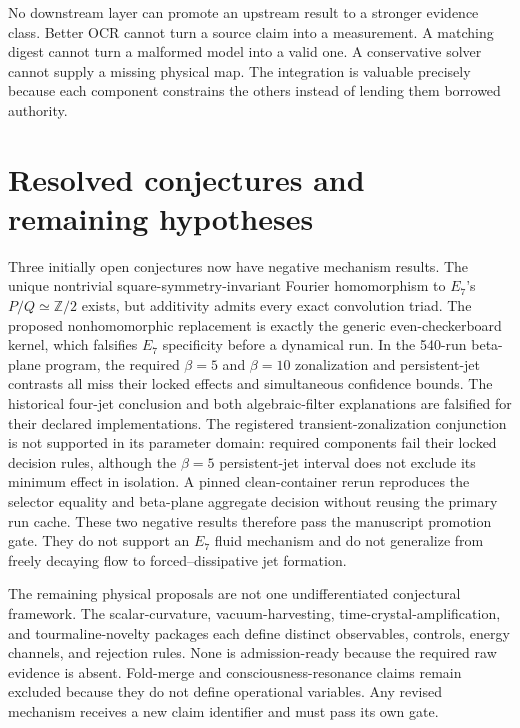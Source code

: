 No downstream layer can promote an upstream result to a stronger evidence
class. Better OCR cannot turn a source claim into a measurement. A matching
digest cannot turn a malformed model into a valid one. A conservative solver
cannot supply a missing physical map. The integration is valuable precisely
because each component constrains the others instead of lending them borrowed
authority.

\section{Resolved conjectures and remaining hypotheses}

Three initially open conjectures now have negative mechanism results. The unique
nontrivial square-symmetry-invariant Fourier homomorphism to $E_7$'s
$P/Q\simeq\mathbb{Z}/2$ exists, but additivity admits every exact convolution
triad. The proposed nonhomomorphic replacement is exactly the generic
even-checkerboard kernel, which falsifies $E_7$ specificity before a dynamical
run. In the 540-run beta-plane program, the required
$\beta=5$ and $\beta=10$ zonalization and persistent-jet contrasts all miss
their locked effects and simultaneous confidence bounds. The historical
four-jet conclusion and both algebraic-filter explanations are falsified for
their declared implementations. The registered transient-zonalization
conjunction is not supported in its parameter domain: required components fail
their locked decision rules, although the $\beta=5$ persistent-jet interval does
not exclude its minimum effect in isolation. A pinned clean-container rerun
reproduces the selector equality and beta-plane aggregate decision without
reusing the primary run cache. These two negative results therefore pass the
manuscript promotion gate. They do not support an $E_7$ fluid mechanism and do
not generalize from freely decaying flow to forced--dissipative jet formation.


The remaining physical proposals are not one undifferentiated conjectural
framework. The scalar-curvature, vacuum-harvesting, time-crystal-amplification,
and tourmaline-novelty packages each define distinct observables, controls,
energy channels, and rejection rules. None is admission-ready because the
required raw evidence is absent. Fold-merge and consciousness-resonance claims
remain excluded because they do not define operational variables. Any revised
mechanism receives a new claim identifier and must pass its own gate.


